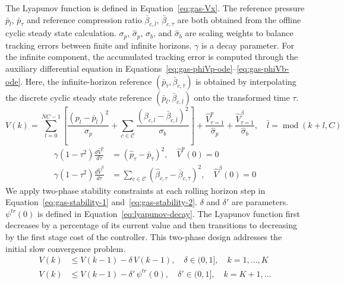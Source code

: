 \documentclass[11pt]{article}
\begin{document}
The Lyapunov function is defined in Equation~\eqref{eq:gas-Vx}. The reference pressure $\bar{p}_{\bar{l}}$, $\bar{p}_{\bar{\tau}}$ and reference compression ratio $\bar{\beta}_{c,\bar{l}}$, $\bar{\beta}_{c,\bar{\tau}}$ are both obtained from the offline cyclic steady state calculation. $\sigma_p$, $\hat{\sigma}_p$, $\sigma_b$, and $\hat{\sigma}_b$ are scaling weights to balance tracking errors between finite and infinite horizons. $\gamma$ is a decay parameter. For the infinite component, the accumulated tracking error is computed through the auxiliary differential equation in Equations~\eqref{eq:gas-phiVp-ode}--\eqref{eq:gas-phiVb-ode}. Here, the infinite-horizon reference $(\bar{p}_{\bar{\tau}}, \bar{\beta}_{c,\bar{\tau}})$ is obtained by interpolating the discrete cyclic steady state reference $(\bar{p}_{\bar{l}}, \bar{\beta}_{c,\bar{l}})$ onto the transformed time $\tau$.
\begin{equation}
V(k) = \sum_{l=0}^{NC-1} \left[ \frac{(p_l - \bar{p}_{\bar{l}})^2}{\sigma_p} + \sum_{c \in \mathcal{C}}\frac{(\beta_{c,l} - \bar{\beta}_{c,\bar{l}})^2}{\sigma_b} \right] + \frac{\hat{V}^{p}_{\tau=1}}{\hat{\sigma}_p} + \frac{\hat{V}^{\beta}_{\tau=1}}{\hat{\sigma}_b}, \quad \bar{l} = \operatorname{mod}(k+l, C) \label{eq:gas-Vx}
\end{equation}
\begin{align}
\gamma(1-\tau^2) \frac{d\hat{V}^{p}}{d\tau} &= (\hat{p}_\tau - \bar{p}_{\bar{\tau}})^2, \quad \hat{V}^{p}(0) = 0 \label{eq:gas-phiVp-ode}\\
\gamma(1-\tau^2) \frac{d\hat{V}^{\beta}}{d\tau} &= \sum_{c \in \mathcal{C}}(\hat{\beta}_{c,\tau} - \bar{\beta}_{c,\bar{\tau}})^2, \quad \hat{V}^{\beta}(0) = 0 \label{eq:gas-phiVb-ode}
\end{align}
We apply two-phase stability constraints at each rolling horizon step in Equation~\eqref{eq:gas-stability-1} and~\eqref{eq:gas-stability-2}. $\delta$ and $\delta'$ are parameters. $\psi^{tr}(0)$ is defined in Equation~\eqref{eq:lyapunov-decay}. The Lyapunov function first decreases by a percentage of its current value and then transitions to decreasing by the first stage cost of the controller. This two-phase design addresses the initial slow convergence problem.
\begin{align}
V(k) &\leq V(k-1) - \delta\, V(k-1), \quad \delta \in (0,1], \quad k = 1, \ldots, K \label{eq:gas-stability-1} \\
V(k) &\leq V(k-1) - \delta'\, \psi^{tr}(0), \quad \delta' \in (0,1], \quad k = K+1, \ldots \label{eq:gas-stability-2}
\end{align}
\end{document}
